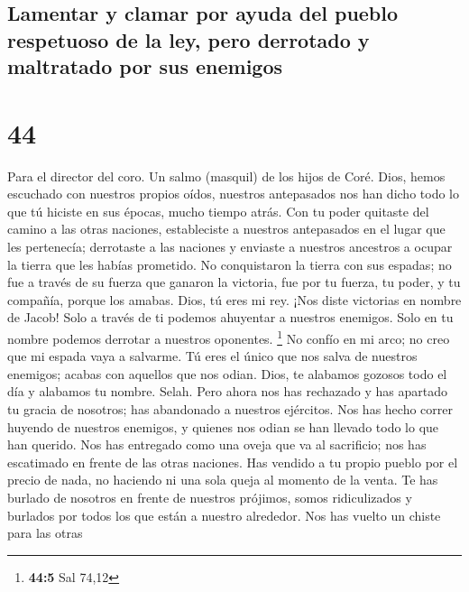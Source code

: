 \hypertarget{lamentar-y-clamar-por-ayuda-del-pueblo-respetuoso-de-la-ley-pero-derrotado-y-maltratado-por-sus-enemigos}{%
\subsection{Lamentar y clamar por ayuda del pueblo respetuoso de la ley,
pero derrotado y maltratado por sus
enemigos}\label{lamentar-y-clamar-por-ayuda-del-pueblo-respetuoso-de-la-ley-pero-derrotado-y-maltratado-por-sus-enemigos}}

\hypertarget{section-43}{%
\section{44}\label{section-43}}

Para el director del coro. Un salmo (masquil) de los hijos de Coré.
 Dios, hemos escuchado con nuestros propios oídos, nuestros
antepasados nos han dicho todo lo que tú hiciste en sus épocas, mucho
tiempo atrás.  Con tu poder quitaste del camino a las otras
naciones, estableciste a nuestros antepasados en el lugar que les
pertenecía; derrotaste a las naciones y enviaste a nuestros ancestros a
ocupar la tierra que les habías prometido.  No conquistaron
la tierra con sus espadas; no fue a través de su fuerza que ganaron la
victoria, fue por tu fuerza, tu poder, y tu compañía, porque los amabas.
 Dios, tú eres mi rey. ¡Nos diste victorias en nombre de
Jacob!  Solo a través de ti podemos ahuyentar a nuestros
enemigos. Solo en tu nombre podemos derrotar a nuestros oponentes.
\footnote{\textbf{44:5} Sal 74,12}  No confío en mi arco; no
creo que mi espada vaya a salvarme.  Tú eres el único que
nos salva de nuestros enemigos; acabas con aquellos que nos odian.
 Dios, te alabamos gozosos todo el día y alabamos tu nombre.
Selah.  Pero ahora nos has rechazado y has apartado tu
gracia de nosotros; has abandonado a nuestros ejércitos. 
Nos has hecho correr huyendo de nuestros enemigos, y quienes nos odian
se han llevado todo lo que han querido.  Nos has entregado
como una oveja que va al sacrificio; nos has escatimado en frente de las
otras naciones.  Has vendido a tu propio pueblo por el
precio de nada, no haciendo ni una sola queja al momento de la venta.
 Te has burlado de nosotros en frente de nuestros prójimos,
somos ridiculizados y burlados por todos los que están a nuestro
alrededor.  Nos has vuelto un chiste para las otras
